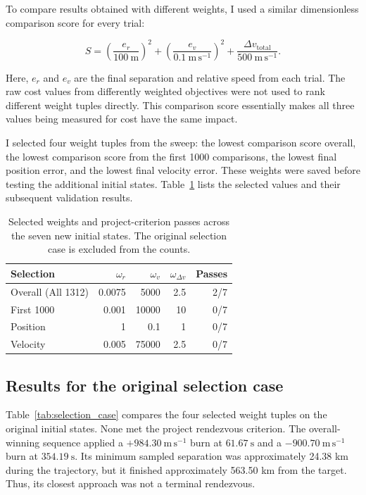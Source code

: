 \documentclass[11pt,letterpaper]{article}
\begin{document}
To compare results obtained with different weights, I used a similar
dimensionless comparison score for every trial:

\begin{equation}
S=\left(\frac{e_r}{100\ \mathrm{m}}\right)^2
 +\left(\frac{e_v}{0.1\ \mathrm{m\,s^{-1}}}\right)^2
 +\frac{\Delta v_{\mathrm{total}}}{500\ \mathrm{m\,s^{-1}}}.
\end{equation}

Here, $e_r$ and $e_v$ are the final separation and relative speed from each trial.
The raw cost values from differently weighted objectives were not used to rank
different weight tuples directly. This comparison score essentially makes all three
values being measured for cost have the same impact.

I selected four weight tuples from the sweep: the lowest comparison
score overall, the lowest comparison score from the first 1000 comparisons, the
lowest final position error, and the lowest final velocity error.
These weights were saved before testing the additional initial states.
Table~\ref{tab:selected_weights} lists the selected values and their
subsequent validation results.

\begin{table}[htbp]
\centering
\caption{Selected weights and project-criterion passes across the seven
new initial states. The original selection case is excluded from the counts.}
\label{tab:selected_weights}
\begin{tabular}{lrrrr}
\toprule
Selection & $\omega_r$ & $\omega_v$ & $\omega_{\Delta v}$ & Passes\\
\midrule
Overall (All 1312) & 0.0075 & 5000 & 2.5 & 2/7\\
First 1000 & 0.001 & 10000 & 10 & 0/7\\
Position & 1 & 0.1 & 1 & 0/7\\
Velocity & 0.005 & 75000 & 2.5 & 0/7\\
\bottomrule
\end{tabular}
\end{table}

\subsection{Results for the original selection case}
Table~\ref{tab:selection_case} compares the four selected weight tuples
on the original initial states. None met the project rendezvous criterion.
The overall-winning sequence applied a $+984.30\ \mathrm{m\,s^{-1}}$
burn at $61.67\ \mathrm{s}$ and a $-900.70\ \mathrm{m\,s^{-1}}$ burn
at $354.19\ \mathrm{s}$. Its minimum sampled separation was approximately
24.38 km during the trajectory, but it finished approximately 563.50 km
from the target. Thus, its closest approach was not a terminal rendezvous.
\end{document}
